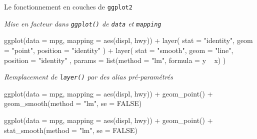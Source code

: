 \documentclass[12pt,handout,ignorenonframetext,]{beamer}
\newenvironment{Shaded}{}{}
\newcommand{\KeywordTok}[1]{\textcolor[rgb]{0.00,0.00,1.00}{{#1}}}
\newcommand{\DataTypeTok}[1]{{#1}}
\newcommand{\StringTok}[1]{\textcolor[rgb]{0.00,0.50,0.50}{{#1}}}
\newcommand{\OtherTok}[1]{\textcolor[rgb]{1.00,0.25,0.00}{{#1}}}
\newcommand{\NormalTok}[1]{{#1}}
\renewenvironment{Shaded}{\begin{snugshade}}{\end{snugshade}}
\begin{document}
\begin{frame}[fragile]{\large Le fonctionnement en \og couches \fg{} de
\texttt{ggplot2}}

\emph{Mise en facteur dans \texttt{ggplot()} de \texttt{data} et
\texttt{mapping}}

\footnotesize \vspace{-1mm}

\begin{Shaded}
\begin{Highlighting}[]
\KeywordTok{ggplot}\NormalTok{(}\DataTypeTok{data =} \NormalTok{mpg, }\DataTypeTok{mapping =} \KeywordTok{aes}\NormalTok{(displ, hwy)) +}\StringTok{ }\KeywordTok{layer}\NormalTok{(}
  \DataTypeTok{stat =} \StringTok{"identity"}\NormalTok{, }\DataTypeTok{geom =} \StringTok{"point"}\NormalTok{, }\DataTypeTok{position =} \StringTok{"identity"}
\NormalTok{) +}\StringTok{ }\KeywordTok{layer}\NormalTok{(}
  \DataTypeTok{stat =} \StringTok{"smooth"}\NormalTok{, }\DataTypeTok{geom =} \StringTok{"line"}\NormalTok{, }\DataTypeTok{position =} \StringTok{"identity"}
  \NormalTok{, }\DataTypeTok{params =} \KeywordTok{list}\NormalTok{(}\DataTypeTok{method =} \StringTok{"lm"}\NormalTok{, }\DataTypeTok{formula =} \NormalTok{y ~}\StringTok{ }\NormalTok{x)}
\NormalTok{)}
\end{Highlighting}
\end{Shaded}

\normalsize \vspace{-3mm}

\emph{Remplacement de \texttt{layer()} par des alias pré-paramétrés}

\footnotesize \vspace{-1mm}

\begin{Shaded}
\begin{Highlighting}[]
\KeywordTok{ggplot}\NormalTok{(}\DataTypeTok{data =} \NormalTok{mpg, }\DataTypeTok{mapping =} \KeywordTok{aes}\NormalTok{(displ, hwy)) +}\StringTok{ }
\StringTok{  }\KeywordTok{geom_point}\NormalTok{() +}\StringTok{ }\KeywordTok{geom_smooth}\NormalTok{(}\DataTypeTok{method =} \StringTok{"lm"}\NormalTok{, }\DataTypeTok{se =} \OtherTok{FALSE}\NormalTok{)}
\end{Highlighting}
\end{Shaded}

\begin{Shaded}
\begin{Highlighting}[]
\KeywordTok{ggplot}\NormalTok{(}\DataTypeTok{data =} \NormalTok{mpg, }\DataTypeTok{mapping =} \KeywordTok{aes}\NormalTok{(displ, hwy)) +}\StringTok{ }
\StringTok{  }\KeywordTok{geom_point}\NormalTok{() +}\StringTok{ }\KeywordTok{stat_smooth}\NormalTok{(}\DataTypeTok{method =} \StringTok{"lm"}\NormalTok{, }\DataTypeTok{se =} \OtherTok{FALSE}\NormalTok{)}
\end{Highlighting}
\end{Shaded}

\end{frame}
\end{document}
